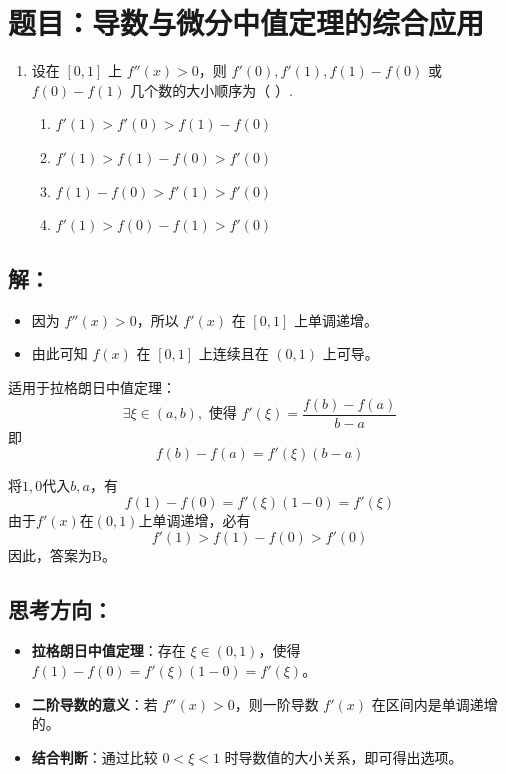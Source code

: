 \documentclass[UTF8]{ctexart}
\begin{document}
\newpage
\section{题目：导数与微分中值定理的综合应用}

\begin{enumerate}
    \item[2.(1)] 设在 $[0, 1]$ 上 $f''(x) > 0$，则 $f'(0), f'(1), f(1)-f(0)$ 或 $f(0)-f(1)$ 几个数的大小顺序为（ \quad ）.
    \begin{enumerate}[label=(\Alph*)]
        \item $f'(1) > f'(0) > f(1)-f(0)$
        \item $f'(1) > f(1)-f(0) > f'(0)$
        \item $f(1)-f(0) > f'(1) > f'(0)$
        \item $f'(1) > f(0)-f(1) > f'(0)$
    \end{enumerate}
\end{enumerate}

\subsection*{解：}

\begin{itemize}
    \item 因为 $f''(x) > 0$，所以 $f'(x)$ 在 $[0, 1]$ 上单调递增。
    \item 由此可知 $f(x)$ 在 $[0, 1]$ 上连续且在 $(0, 1)$ 上可导。
\end{itemize}

适用于拉格朗日中值定理：
\[ \exists \xi \in (a, b), \text{ 使得 } f'(\xi) = \frac{f(b) - f(a)}{b - a} \]
即\[ f(b) - f(a) = f'(\xi)(b-a) \]

将$1,0$代入$b,a$，有
\[ f(1)-f(0) = f'(\xi) (1-0) =  f'(\xi) \] 
由于$f'(x)$在$(0,1)$上单调递增，必有
\[ f'(1) > f(1)-f(0) > f'(0) \]
因此，答案为B。

\subsection*{思考方向：}
\begin{itemize}
    \item \textbf{拉格朗日中值定理}：存在 $\xi \in (0, 1)$，使得 $f(1) - f(0) = f'(\xi)(1 - 0) = f'(\xi)$。
    \item \textbf{二阶导数的意义}：若 $f''(x) > 0$，则一阶导数 $f'(x)$ 在区间内是单调递增的。
    \item \textbf{结合判断}：通过比较 $0 < \xi < 1$ 时导数值的大小关系，即可得出选项。
\end{itemize}
\end{document}
